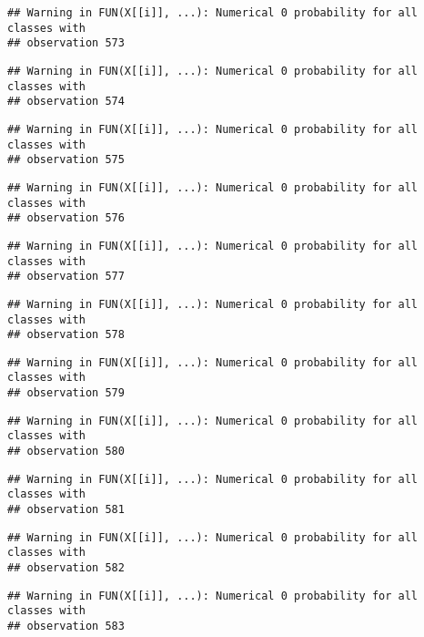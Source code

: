\documentclass[
]{article}
\begin{document}
\begin{verbatim}
## Warning in FUN(X[[i]], ...): Numerical 0 probability for all classes with
## observation 573
\end{verbatim}

\begin{verbatim}
## Warning in FUN(X[[i]], ...): Numerical 0 probability for all classes with
## observation 574
\end{verbatim}

\begin{verbatim}
## Warning in FUN(X[[i]], ...): Numerical 0 probability for all classes with
## observation 575
\end{verbatim}

\begin{verbatim}
## Warning in FUN(X[[i]], ...): Numerical 0 probability for all classes with
## observation 576
\end{verbatim}

\begin{verbatim}
## Warning in FUN(X[[i]], ...): Numerical 0 probability for all classes with
## observation 577
\end{verbatim}

\begin{verbatim}
## Warning in FUN(X[[i]], ...): Numerical 0 probability for all classes with
## observation 578
\end{verbatim}

\begin{verbatim}
## Warning in FUN(X[[i]], ...): Numerical 0 probability for all classes with
## observation 579
\end{verbatim}

\begin{verbatim}
## Warning in FUN(X[[i]], ...): Numerical 0 probability for all classes with
## observation 580
\end{verbatim}

\begin{verbatim}
## Warning in FUN(X[[i]], ...): Numerical 0 probability for all classes with
## observation 581
\end{verbatim}

\begin{verbatim}
## Warning in FUN(X[[i]], ...): Numerical 0 probability for all classes with
## observation 582
\end{verbatim}

\begin{verbatim}
## Warning in FUN(X[[i]], ...): Numerical 0 probability for all classes with
## observation 583
\end{verbatim}
\end{document}
